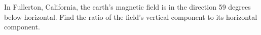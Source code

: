 In Fullerton, California, the earth's magnetic field is in the direction
59 degrees below horizontal. Find the ratio of the field's vertical component
to its horizontal component.
